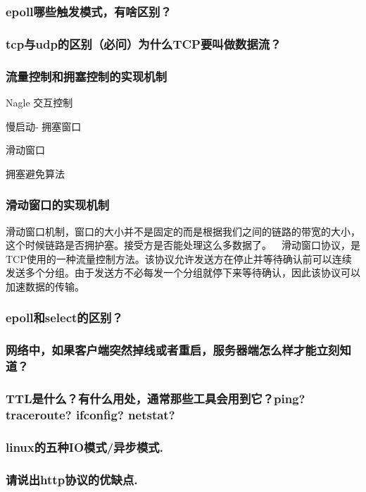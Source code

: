 \documentclass[UTF8,a4paper,8pt]{ctexart}
\begin{document}
		\subsubsection{epoll哪些触发模式，有啥区别？}
		
		\subsubsection{tcp与udp的区别（必问）为什么TCP要叫做数据流？}
		
		\subsubsection{流量控制和拥塞控制的实现机制}
			Nagle 交互控制
		
			慢启动- 拥塞窗口
			
			滑动窗口
			
			拥塞避免算法
			
		\subsubsection{滑动窗口的实现机制}
			滑动窗口机制，窗口的大小并不是固定的而是根据我们之间的链路的带宽的大小，这个时候链路是否拥护塞。接受方是否能处理这么多数据了。  滑动窗口协议，是TCP使用的一种流量控制方法。该协议允许发送方在停止并等待确认前可以连续发送多个分组。由于发送方不必每发一个分组就停下来等待确认，因此该协议可以加速数据的传输。
		
		\subsubsection{epoll和select的区别？}
		
		\subsubsection{网络中，如果客户端突然掉线或者重启，服务器端怎么样才能立刻知道？}
		
		\subsubsection{TTL是什么？有什么用处，通常那些工具会用到它？ping? traceroute? ifconfig? netstat?}
		
		\subsubsection{linux的五种IO模式/异步模式.}
		
		\subsubsection{请说出http协议的优缺点.}
		
\end{document}
